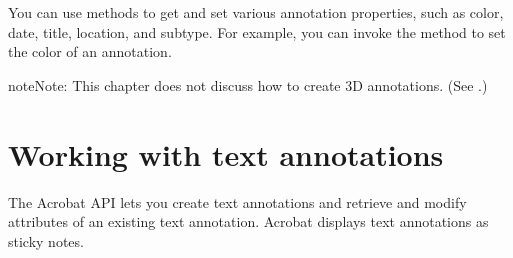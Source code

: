 \documentclass[letterpaper,12pt,english,openany,oneside]{sphinxmanual}
\begin{document}
You can use  methods to get and set various annotation properties, such as color, date, title, location, and subtype. For example, you can invoke the  method to set the color of an annotation.

\begin{sphinxadmonition}{note}{Note:}
This chapter does not discuss how to create 3D annotations. (See .)
\end{sphinxadmonition}


\section{Working with text annotations}
\label{\detokenize{Plugins_Annotations:working-with-text-annotations}}
The Acrobat API lets you create text annotations and retrieve and modify attributes of an existing text annotation. Acrobat displays text annotations as sticky notes.
\end{document}
